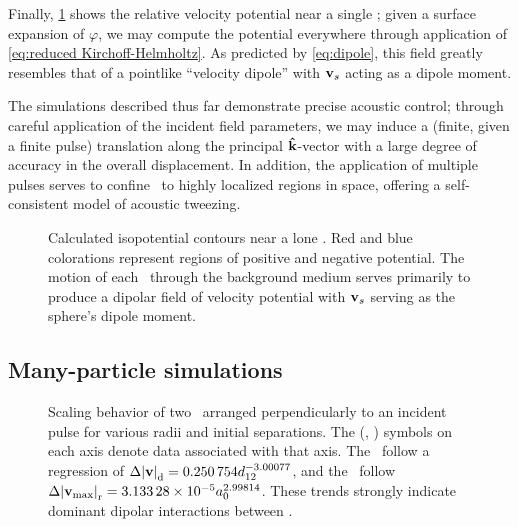 Finally, \cref{fig:dipole field} shows the relative velocity potential near a single \bubble; given a surface expansion of $\varphi$, we may compute the potential everywhere through application of \cref{eq:reduced Kirchoff-Helmholtz}.
As predicted by \cref{eq:dipole}, this field greatly resembles that of a
pointlike ``velocity dipole'' with $\vb{v}_s$ acting as a dipole moment.

The simulations described thus far demonstrate precise acoustic control; through careful application of the incident field parameters, we may induce a (finite, given a finite pulse) translation along the principal $\vu{k}$-vector with a large degree of accuracy in the overall displacement.
In addition, the application of multiple pulses serves to confine \bubbles\ to highly localized regions in space, offering a self-consistent model of acoustic tweezing.


\begin{figure}
  \centering
  \caption{
    \label{fig:dipole field}
    Calculated isopotential contours near a lone \bubble.
    Red and blue colorations represent regions of positive and negative potential.
    The motion of each \bubble\ through the background medium serves primarily to produce a dipolar field of velocity potential with $\vb{v}_s$ serving as the sphere's dipole moment.
  }
\end{figure}

\subsection{Many-particle simulations}

\begin{figure}
  \centering
  \caption{
    \label{fig:double scaling}
    Scaling behavior of two \bubbles\ arranged perpendicularly to an incident pulse for various radii and initial separations.
    The (\redTriangle, \blueCircle) symbols on each axis denote data associated with that axis.
    The \redTriangle\ follow a regression of $\Delta \abs{\vb{v}}_\text{d} = \num{0.250754} d_{12}^{-3.00077}$, and the \blueCircle\ follow $\Delta\abs{\vb{v}_\text{max}}_\text{r} = \num{3.13328e-5} a_0^{2.99814}$.
    These trends strongly indicate dominant dipolar interactions between \bubbles.
  }
\end{figure}

